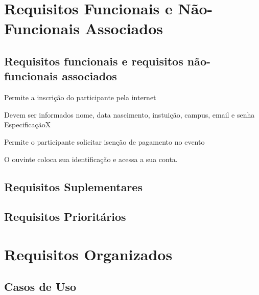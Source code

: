\documentclass[12pt,a4paper]{article}
\begin{document}
        \section{Requisitos Funcionais e Não-Funcionais Associados}
        
        	\subsection{Requisitos funcionais e requisitos não-funcionais associados}
        

		\setcounter{NumberReqF}{0}
		\setcounter{NumberReqNF}{0}
        	
        	{Permite a inscrição do participante pela internet}
        	{%
        	  {Devem ser informados nome, data nascimento, instuição, campus, email e senha}
        	  {Especificação}{X}{}%
        	  
        	  
        	}
        	
        	{Permite o participante solicitar isenção de pagamento no evento}
        	{%
        	}
        	
        	
        	
        	{O ouvinte coloca sua identificação e acessa a sua conta.}
        	{%
        	
        	}
        	        	        	
        	\FloatBarrier	
        	
        	
        	\subsection{Requisitos Suplementares}
        	
        	\subsection{Requisitos Prioritários}
        	
        	\newpage
        	\section{Requisitos Organizados}
	        	\subsection{Casos de Uso}
	        	
\end{document}
